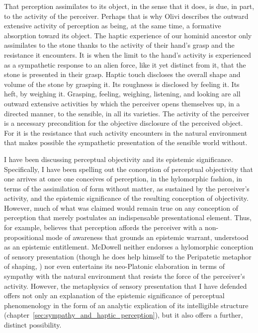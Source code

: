 That perception assimilates to its object, in the sense that it does, is due, in part, to the activity of the perceiver. Perhaps that is why Olivi describes the outward extensive activity of perception as being, at the same time, a formative absorption toward its object.  The haptic experience of our hominid ancestor only assimilates to the stone thanks to the activity of their hand's grasp and the resistance it encounters. It is when the limit to the hand's activity is experienced as a sympathetic response to an alien force, like it yet distinct from it, that the stone is presented in their grasp. Haptic touch discloses the overall shape and volume of the stone by grasping it. Its roughness is disclosed by feeling it. Its heft, by weighing it. Grasping, feeling, weighing, listening, and looking are all outward extensive activities by which the perceiver opens themselves up, in a directed manner, to the sensible, in all its varieties. The activity of the perceiver is a necessary precondition for the objective disclosure of the perceived object. For it is the resistance that such activity encounters in the natural environment that makes possible the sympathetic presentation of the sensible world without.

I have been discussing perceptual objectivity and its epistemic significance. Specifically, I have been spelling out the conception of perceptual objectivity that one arrives at once one conceives of perception, in the hylomorphic fashion, in terms of the assimilation of form without matter, as sustained by the perceiver's activity, and the epistemic significance of the resulting conception of objectivity. However, much of what was claimed would remain true on any conception of perception that merely postulates an indispensable presentational element. Thus, for example, \citet{McDowell:2008fk} believes that perception affords the perceiver with a non-propositional mode of awareness that grounds an epistemic warrant, understood as an epistemic entitlement. McDowell neither endorses a hylomorphic conception of sensory presentation (though he does help himself to the Peripatetic metaphor of shaping, \citealt{McDowell:1998vn}) nor even entertains its neo-Platonic elaboration in terms of sympathy with the natural environment that resists the force of the perceiver's activity. However, the metaphysics of sensory presentation that I have defended offers not only an explanation of the epistemic significance of perceptual phenomenology in the form of an analytic explication of its intelligible structure (chapter~\ref{sec:sympathy_and_haptic_perception}), but it also offers a further, distinct possibility.


